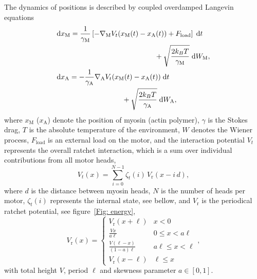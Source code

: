 \documentclass[aps,pre,twocolumn,showpacs,showkeys]{revtex4-1}
\newcommand{\rmd}{{\mathrm d}}
\begin{document}
The dynamics of positions is described by coupled overdamped Langevin equations 
\begin{align}
&\begin{multlined}[b]
\rmd x_\text{M} = 
\frac{1}{\gamma_\text{M}} \left[ - \nabla_\text{M} V_t(x_\text{M}(t) - x_\text{A}(t)) + F_\text{load} \right] \; \rmd t 
\\ 
+ \sqrt{ \frac{2 k_B T}{\gamma_\text{M}} } \; \rmd W_\text{M} ,
\end{multlined}
\label{eom_M} \\
&\begin{multlined}[b][.42\textwidth]
\rmd x_\text{A} = 
- \frac{1}{\gamma_\text{A}} \nabla_\text{A} V_t(x_\text{M}(t) - x_\text{A}(t)) \; \rmd t 
\\
+ \sqrt{ \frac{2 k_B T}{\gamma_\text{A}} } \; \rmd W_\text{A} ,
\end{multlined}
\label{eom_A}
\end{align}
where $x_\text{M}$ ($x_\text{A}$) denote the position of myosin (actin polymer), 
$\gamma$ is the Stokes drag,
$T$ is the absolute temperature of the environment,
$W$ denotes the Wiener process,
$F_\text{load}$ is an external load on the motor, 
and the interaction potential $V_t$ represents the overall ratchet interaction, which is a sum over individual contributions from all motor heads,
\begin{equation}
V_t(x) = \sum\limits_{i=0}^{N-1} \zeta_t(i) \, V_\text{r} (x - i \, d ), 
\label{eq:ratchet_interaction}
\end{equation}
where $d$ is the distance between myosin heads, 
$N$ is the number of heads per motor,
$\zeta_t(i)$ represents the internal state, see bellow, 
and $V_\text{r}$ is the periodical ratchet potential, see figure~\ref{Fig: energy},
\begin{equation}
V_\text{r}(x) =  \begin{cases}
        V_\text{r}(x+\ell) & x < 0 \\[1ex] 
        \displaystyle \frac{ V x }{ a \ell } & 0 \leq x < a \ell \\[2ex]
        \displaystyle \frac{ V (\ell-x) }{ (1-a) \ell } & a \ell \leq x < \ell \\[2ex]
        V_\text{r}(x-\ell) & \ell \leq x  
   \end{cases} ,
   \label{rat_pot}
\end{equation}
with total height $V$,
period $\ell$ 
and skewness parameter $a \in [0,1]$. 
\end{document}
